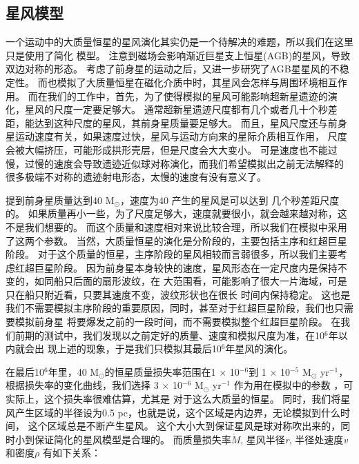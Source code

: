 \subsection{星风模型}
一个运动中的大质量恒星的星风演化其实仍是一个待解决的难题，所以我们在这里只是使用了简化
模型。
\citet{vanMarle2014}注意到磁场会影响渐近巨星支上恒星(AGB)的星风，导致双边对称的形态。
考虑了前身星的运动之后，\citet{vanMarle2014a}又进一步研究了AGB星星风的不稳定性。
而\citet{Meyer2017}也模拟了大质量恒星在磁化介质中时，其星风会怎样与周围环境相互作用。
而在我们的工作中，首先，为了使得模拟的星风可能影响超新星遗迹的演化，星风的尺度一定要足够大。
通常超新星遗迹尺度都有几个或者几十个秒差距，能达到这种尺度的星风，其前身星质量要足够大。
而且，星风尺度还与前身星运动速度有关，如果速度过快，星风与运动方向来的星际介质相互作用，
尺度会被大幅挤压，可能形成拱形壳层，但是尺度会大大变小。
可是速度也不能过慢，过慢的速度会导致遗迹近似球对称演化，而我们希望模拟出之前无法解释的
很多极端不对称的遗迹射电形态，太慢的速度有没有意义了。

\citet{Meyer2014}提到前身星质量达到40 M$_{\odot}$，速度为40 \kms 产生的星风是可以达到
几个秒差距尺度的。
如果质量再小一些，为了尺度足够大，速度就要很小，就会越来越对称，这不是我们想要的。
而这个质量和速度相对来说比较合理，所以我们在模拟中采用了这两个参数。
当然，大质量恒星的演化是分阶段的，主要包括主序和红超巨星阶段。
对于这个质量的恒星，主序阶段的星风相较而言弱很多，所以我们主要考虑红超巨星阶段。
因为前身星本身较快的速度，星风形态在一定尺度内是保持不变的，如同船只后面的扇形波纹，在
大范围看，可能影响了很大一片海域，可是只在船只附近看，只要其速度不变，波纹形状也在很长
时间内保持稳定。
这也是我们不需要模拟主序阶段的重要原因，同时，甚至对于红超巨星阶段，我们也只需要模拟前身星
将要爆发之前的一段时间，而不需要模拟整个红超巨星阶段。
在我们前期的测试中，我们发现以之前定好的质量、速度和模拟尺度为准，在10$^{6}$年以内就会出
现上述的现象，于是我们只模拟其最后10$^{6}$年星风的演化。

在最后10$^{6}$年里，40 M$_{\odot}$的恒星质量损失率范围在1 $\times$ 10$^{-6}$到
1 $\times$ 10$^{-5}$ M$_{\odot}$ yr$^{-1}$，根据损失率的变化曲线，我们选择
3 $\times$ 10$^{-6}$ M$_{\odot}$ yr$^{-1}$ 作为用在模拟中的参数
\citep{Meyer2014, vanMarle2012, vanMarle2015}，可实际上，这个损失率很难估算，尤其是
对于这么大质量的恒星\citep{Meyer2014a, Gvaramadze2014}。
同时，我们将星风产生区域的半径设为0.5 pc，也就是说，这个区域是内边界，无论模拟到什么时间，
这个区域总是不断产生星风。
这个大小大到保证星风是球对称吹出来的，同时小到保证简化的星风模型是合理的。
而质量损失率\textit{$\dot{M}$}, 星风半径\textit{r}, 半径处速度\textit{v}和密度\textit{$\rho$}
有如下关系：

